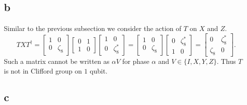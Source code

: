 \documentclass[letterpaper,12pt,oneside,onecolumn]{article}
\begin{document}
\subsection{b}
\paragraph{}
Similar to the previous subsection we consider the action of $T$ on $X$ and $Z$.
$$TXT^{\dagger} = \begin{bmatrix} 1 & 0 \\ 0& \zeta_8 \end{bmatrix}\begin{bmatrix} 0 & 1 \\ 1 & 0 \end{bmatrix}\begin{bmatrix} 1 & 0 \\ 0& \zeta_8^* \end{bmatrix} = \begin{bmatrix} 1 & 0 \\ 0& \zeta_8 \end{bmatrix}\begin{bmatrix} 0 & \zeta^*_8 \\ 1 & 0 \end{bmatrix} = \begin{bmatrix} 0 & \zeta_8^* \\ \zeta_8 & 0 \end{bmatrix}.$$
Such a matrix cannot be written as  $\alpha V$ for phase $\alpha$ and $V \in \{I,X,Y,Z\}$. Thus $T$ is not in Clifford group on $1$ qubit.
\subsection{c}
\end{document}
